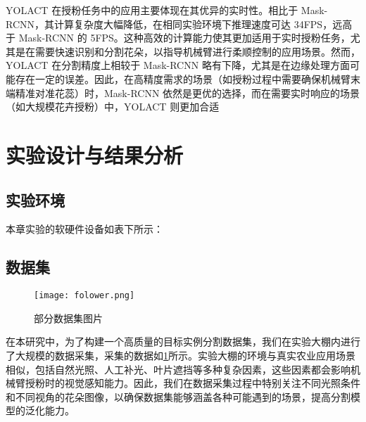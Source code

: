 YOLACT 在授粉任务中的应用主要体现在其优异的实时性。相比于 Mask-RCNN，其计算复杂度大幅降低，在相同实验环境下推理速度可达 34FPS，远高于 Mask-RCNN 的 5FPS。这种高效的计算能力使其更加适用于实时授粉任务，尤其是在需要快速识别和分割花朵，以指导机械臂进行柔顺控制的应用场景。然而，YOLACT 在分割精度上相较于 Mask-RCNN 略有下降，尤其是在边缘处理方面可能存在一定的误差。因此，在高精度需求的场景（如授粉过程中需要确保机械臂末端精准对准花蕊）时，Mask-RCNN 依然是更优的选择，而在需要实时响应的场景（如大规模花卉授粉）中，YOLACT 则更加合适


\section{实验设计与结果分析}
\subsection{实验环境}
本章实验的软硬件设备如表下所示：
\begin{table}[htbp]
	\caption[目标分割实验环境]{目标分割实验环境}
	\label{tab:division-of-microchannels}
\end{table}
\subsection{数据集}  \label{sec:dataset}


 \begin{figure}[htb]
	\texttt{[image: folower.png]}
	\caption[部分数据集图片]{部分数据集图片} %
	\label{fig:folower.drawio}
\end{figure}
在本研究中，为了构建一个高质量的目标实例分割数据集，我们在实验大棚内进行了大规模的数据采集，采集的数据如\cref{fig:folower.drawio}所示。实验大棚的环境与真实农业应用场景相似，包括自然光照、人工补光、叶片遮挡等多种复杂因素，这些因素都会影响机械臂授粉时的视觉感知能力。因此，我们在数据采集过程中特别关注不同光照条件和不同视角的花朵图像，以确保数据集能够涵盖各种可能遇到的场景，提高分割模型的泛化能力。

